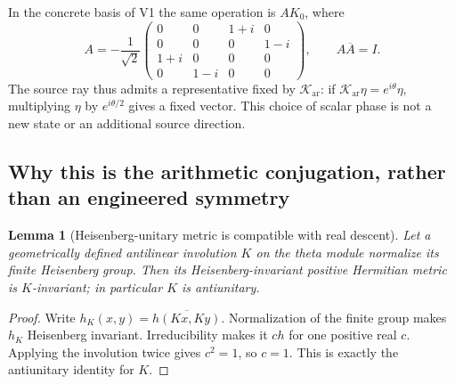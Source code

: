 \documentclass[11pt]{article}
\newtheorem{lemma}[lemma]{Lemma}
\theoremstyle{definition}
\theoremstyle{remark}
\begin{document}
In the concrete basis of V1 the same operation is $A K_0$, where
\begin{equation}
 A=-\frac1{\sqrt2}
 \begin{pmatrix}
 0&0&1+i&0\\
 0&0&0&1-i\\
 1+i&0&0&0\\
 0&1-i&0&0
 \end{pmatrix},\qquad A\overline A=I.
 \label{eq:v4-real-matrix}
\end{equation}
The source ray thus admits a representative fixed by
$\mathcal K_{\mathrm{ar}}$: if
$\mathcal K_{\mathrm{ar}}\eta=e^{i\theta}\eta$, multiplying $\eta$ by
$e^{i\theta/2}$ gives a fixed vector. This choice of scalar phase is not
a new state or an additional source direction.

\subsection{Why this is the arithmetic conjugation, rather than an engineered symmetry}

\begin{lemma}[Heisenberg-unitary metric is compatible with real descent]
\label{lem:v4-real-metric}
Let a geometrically defined antilinear involution $K$ on the theta module
normalize its finite Heisenberg group. Then its Heisenberg-invariant
positive Hermitian metric is $K$-invariant; in particular $K$ is antiunitary.
\end{lemma}
\begin{proof}
Write $h_K(x,y)=\overline{h(Kx,Ky)}$. Normalization of the finite group
makes $h_K$ Heisenberg invariant. Irreducibility makes it $c h$ for one
positive real $c$. Applying the involution twice gives $c^2=1$, so $c=1$.
This is exactly the antiunitary identity for $K$.
\end{proof}
\end{document}
